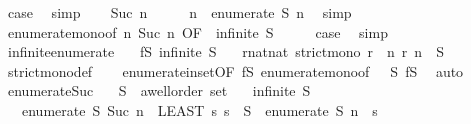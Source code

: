 \begin{isabellebody}
\ {\isacharquery}case\ \isamarkupfalse%
\ simp\isanewline
{}\isamarkupfalse%
\isanewline
\ \ \isamarkupfalse%
\ {\isacharparenleft}Suc\ n{\isacharparenright}\isanewline
\ \ \isamarkupfalse%
\ \isamarkupfalse%
\ {\isachardoublequoteopen}n\ {\isasymle}\ enumerate\ S\ n{\isachardoublequoteclose}\ \isamarkupfalse%
\ simp\isanewline
\ \ \isamarkupfalse%
\ \isamarkupfalse%
\ enumerate{\isacharunderscore}mono{\isacharbrackleft}of\ n\ {\isachardoublequoteopen}Suc\ n{\isachardoublequoteclose}{\isacharcomma}\ OF\ {\isacharunderscore}\ {\isacartoucheopen}infinite\ S{\isacartoucheclose}{\isacharbrackright}\isanewline
\ \ \isamarkupfalse%
\ \isamarkupfalse%
\ {\isacharquery}case\ \isamarkupfalse%
\ simp\isanewline
{}\isamarkupfalse%
%
\endisatagproof
{\isafoldproof}%
%
\isadelimproof
\isanewline
%
\endisadelimproof
\isanewline
{}\isamarkupfalse%
\ infinite{\isacharunderscore}enumerate{\isacharcolon}\isanewline
\ \ \ fS{\isacharcolon}\ {\isachardoublequoteopen}infinite\ S{\isachardoublequoteclose}\isanewline
\ \ \ {\isachardoublequoteopen}{\isasymexists}r{\isacharcolon}{\isacharcolon}nat{\isasymRightarrow}nat{\isachardot}\ strict{\isacharunderscore}mono\ r\ {\isasymand}\ {\isacharparenleft}{\isasymforall}n{\isachardot}\ r\ n\ {\isasymin}\ S{\isacharparenright}{\isachardoublequoteclose}\isanewline
%
\isadelimproof
\ \ %
\endisadelimproof
%
\isatagproof
{}\isamarkupfalse%
\ strict{\isacharunderscore}mono{\isacharunderscore}def\isanewline
\ \ \isamarkupfalse%
\ enumerate{\isacharunderscore}in{\isacharunderscore}set{\isacharbrackleft}OF\ fS{\isacharbrackright}\ enumerate{\isacharunderscore}mono{\isacharbrackleft}of\ {\isacharunderscore}\ {\isacharunderscore}\ S{\isacharbrackright}\ fS\ \isamarkupfalse%
\ auto%
\endisatagproof
{\isafoldproof}%
%
\isadelimproof
\isanewline
%
\endisadelimproof
\isanewline
{}\isamarkupfalse%
\ enumerate{\isacharunderscore}Suc{\isacharprime}{\isacharprime}{\isacharcolon}\isanewline
\ \ \ S\ {\isacharcolon}{\isacharcolon}\ {\isachardoublequoteopen}{\isacharprime}a{\isacharcolon}{\isacharcolon}wellorder\ set{\isachardoublequoteclose}\isanewline
\ \ \ {\isachardoublequoteopen}infinite\ S{\isachardoublequoteclose}\isanewline
\ \ \ {\isachardoublequoteopen}enumerate\ S\ {\isacharparenleft}Suc\ n{\isacharparenright}\ {\isacharequal}\ {\isacharparenleft}LEAST\ s{\isachardot}\ s\ {\isasymin}\ S\ {\isasymand}\ enumerate\ S\ n\ {\isacharless}\ s{\isacharparenright}{\isachardoublequoteclose}\isanewline

\end{isabellebody}
